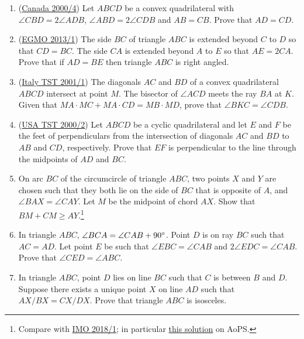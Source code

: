 \documentclass[11pt,paper=letter]{scrartcl}
\begin{document}
\begin{enumerate}
  \item (\href{https://aops.com/community/c6h77707}{Canada 2000/4}) Let $ABCD$ be a convex quadrilateral with $\angle CBD = 2 \angle ADB$, $\angle ABD = 2 \angle CDB$ and $AB = CB$. Prove that $AD = CD$.

  \item (\href{https://aops.com/community/c6h529042}{EGMO 2013/1}) The side $BC$ of triangle $ABC$ is extended beyond $C$ to $D$ so that $CD = BC$. The side $CA$ is extended beyond $A$ to $E$ so that $AE = 2CA$. Prove that if $AD = BE$ then triangle $ABC$ is right angled.
  
  \item (\href{https://aops.com/community/c6h228384}{Italy TST 2001/1}) The diagonals $ AC$ and $ BD$ of a convex quadrilateral $ ABCD$ intersect at point $ M$. The bisector of $ \angle ACD$ meets the ray $ BA$ at $ K$. Given that $ MA \cdot MC +MA \cdot CD = MB \cdot MD$, prove that $ \angle BKC = \angle CDB$.

  \item (\href{https://aops.com/community/c6h326960}{USA TST 2000/2}) Let $ ABCD$ be a cyclic quadrilateral and let $ E$ and $ F$ be the feet of perpendiculars from the intersection of diagonals $ AC$ and $ BD$ to $ AB$ and $ CD$, respectively. Prove that $ EF$ is perpendicular to the line through the midpoints of $ AD$ and $ BC$.

  \item On arc $BC$ of the circumcircle of triangle $ABC$, two points $X$ and $Y$ are chosen such that they both lie on the side of $BC$ that is opposite of $A$, and $\angle BAX = \angle CAY$. Let $M$ be the midpoint of chord $AX$. Show that $BM + CM \geq AY$.\footnote{Compare with \href{https://aops.com/community/c6h1670580}{IMO 2018/1}; in particular \href{http://artofproblemsolving.com/community/c6h1670580p10626602}{this solution} on AoPS.} %

  \item In triangle $ABC$, $\angle BCA = \angle CAB + 90^\circ$. Point $D$ is on ray $BC$ such that $AC = AD$. Let point $E$ be such that $\angle EBC = \angle CAB$ and $2\angle EDC = \angle CAB$. Prove that $\angle CED = \angle ABC$.

  \item In triangle $ABC$, point $D$ lies on line $BC$ such that $C$ is between $B$ and $D$. Suppose there exists a unique point $X$ on line $AD$ such that $AX/BX = CX/DX$. Prove that triangle $ABC$ is isosceles.


\end{enumerate}
\end{document}
